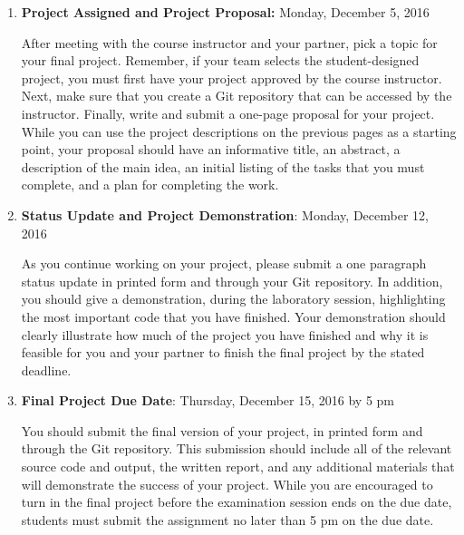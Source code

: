 \vspace*{-.1in}
\begin{enumerate}

  \itemsep0in

  \item {\bf Project Assigned and Project Proposal:} Monday, December 5, 2016

    After meeting with the course instructor and your partner, pick a topic for your final project.  Remember, if your
    team selects the student-designed project, you must first have your project approved by the course instructor.
    Next, make sure that you create a Git repository that can be accessed by the instructor. Finally, write and submit a
    one-page proposal for your project. While you can use the project descriptions on the previous pages as a starting
    point, your proposal should have an informative title, an abstract, a description of the main idea, an initial
    listing of the tasks that you must complete, and a plan for completing the work.

  \item {\bf Status Update and Project Demonstration}: Monday, December 12, 2016

    As you continue working on your project, please submit a one paragraph status update in printed form and through
    your Git repository. In addition, you should give a demonstration, during the laboratory session, highlighting the
    most important code that you have finished. Your demonstration should clearly illustrate how much of the project you
    have finished and why it is feasible for you and your partner to finish the final project by the stated deadline.

  \item {\bf Final Project Due Date}: Thursday, December 15, 2016 by 5 pm

    You should submit the final version of your project, in printed form and through the Git repository. This submission
    should include all of the relevant source code and output, the written report, and any additional materials that
    will demonstrate the success of your project.  While you are encouraged to turn in the final project before the
    examination session ends on the due date, students must submit the assignment no later than 5 pm on the due date.

\end{enumerate}
\vspace*{-.1in}


